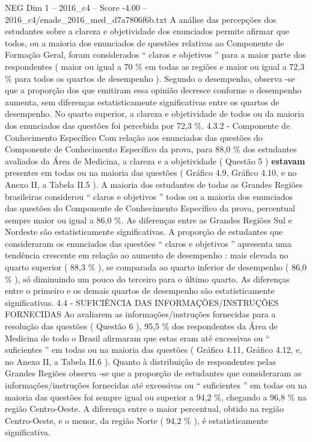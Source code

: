 \begin{textsample}{NEG Dim 1 – 2016\_c4 – Score -4.00 – 2016\_c4/enade\_2016\_med\_d7a7806f6b.txt}
A análise das percepções dos estudantes sobre a clareza e objetividade dos enunciados permite afirmar que todos, ou a maioria dos enunciados de questões relativas ao Componente de Formação Geral, foram considerados “ claros e objetivos ” para a maior parte dos respondentes ( maior ou igual a 70 \% em todas as regiões e maior ou igual a 72,3 \% para todos os quartos de desempenho ).
Segundo o desempenho, observa -se que a proporção dos que emitiram essa opinião decresce conforme o desempenho aumenta, sem diferenças estatisticamente significativas entre os quartos de desempenho.
No quarto superior, a clareza e objetividade de todos ou da maioria dos enunciados das questões foi percebida por 72,3 \%. 4.3.2 - Componente de Conhecimento Específico Com relação aos enunciados das questões do Componente de Conhecimento Específico da prova, para 88,0 \% dos estudantes avaliados da Área de Medicina, a clareza e a objetividade ( Questão 5 ) \textbf{estavam} presentes em todas ou na maioria das questões ( Gráfico 4.9, Gráfico 4.10, e no Anexo II, a Tabela II.5 ).
A maioria dos estudantes de todas as Grandes Regiões brasileiras considerou “ claros e objetivos ” todos ou a maioria dos enunciados das questões do Componente de Conhecimento Específico da prova, percentual sempre maior ou igual a 86,0 \%.
As diferenças entre as Grandes Regiões Sul e Nordeste são estatisticamente significativas.
A proporção de estudantes que consideraram os enunciados das questões “ claros e objetivos ” apresenta uma tendência crescente em relação ao aumento de desempenho : mais elevada no quarto superior ( 88,3 \% ), se comparada ao quarto inferior de desempenho ( 86,0 \% ), só diminuindo um pouco do terceiro para o último quarto.
As diferenças entre o primeiro e os demais quartos de desempenho são estatisticamente significativas. 4.4 - SUFICIÊNCIA DAS INFORMAÇÕES/INSTRUÇÕES FORNECIDAS Ao avaliarem as informações/instruções fornecidas para a resolução das questões ( Questão 6 ), 95,5 \% dos respondentes da Área de Medicina de todo o Brasil afirmaram que estas eram até excessivas ou “ suficientes ” em todas ou na maioria das questões ( Gráfico 4.11, Gráfico 4.12, e, no Anexo II, a Tabela II.6 ).
Quanto à distribuição de respondentes pelas Grandes Regiões observa -se que a proporção de estudantes que consideraram as informações/instruções fornecidas até excessivas ou “ suficientes ” em todas ou na maioria das questões foi sempre igual ou superior a 94,2 \%, chegando a 96,8 \% na região Centro-Oeste.
A diferença entre o maior percentual, obtido na região Centro-Oeste, e o menor, da região Norte ( 94,2 \% ), é estatisticamente significativa.

\end{textsample}

